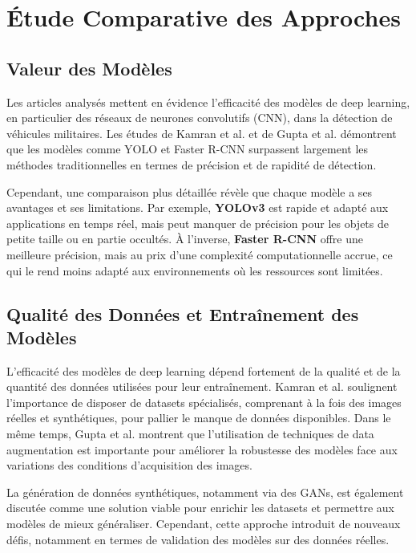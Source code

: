 \section{Étude Comparative des Approches}

\subsection{Valeur des Modèles}

Les articles analysés mettent en évidence l'efficacité des modèles de deep learning, en particulier des réseaux de neurones convolutifs (CNN), dans la détection de véhicules militaires. Les études de Kamran et al. \cite{kamran2020} et de Gupta et al. \cite{gupta2021} démontrent que les modèles comme YOLO et Faster R-CNN surpassent largement les méthodes traditionnelles en termes de précision et de rapidité de détection.

Cependant, une comparaison plus détaillée révèle que chaque modèle a ses avantages et ses limitations. Par exemple, \textbf{YOLOv3} est rapide et adapté aux applications en temps réel, mais peut manquer de précision pour les objets de petite taille ou en partie occultés. À l'inverse, \textbf{Faster R-CNN} offre une meilleure précision, mais au prix d'une complexité computationnelle accrue, ce qui le rend moins adapté aux environnements où les ressources sont limitées.

\subsection{Qualité des Données et Entraînement des Modèles}

L'efficacité des modèles de deep learning dépend fortement de la qualité et de la quantité des données utilisées pour leur entraînement. Kamran et al. \cite{kamran2020} soulignent l'importance de disposer de datasets spécialisés, comprenant à la fois des images réelles et synthétiques, pour pallier le manque de données disponibles. Dans le même temps, Gupta et al. \cite{gupta2021} montrent que l'utilisation de techniques de data augmentation est importante pour améliorer la robustesse des modèles face aux variations des conditions d'acquisition des images.

La génération de données synthétiques, notamment via des GANs, est également discutée comme une solution viable pour enrichir les datasets et permettre aux modèles de mieux généraliser. Cependant, cette approche introduit de nouveaux défis, notamment en termes de validation des modèles sur des données réelles.

